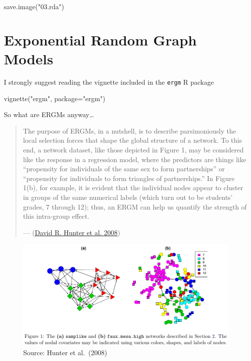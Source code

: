 \documentclass[
]{book}
\newenvironment{Shaded}{\begin{snugshade}}{\end{snugshade}}
\newcommand{\AttributeTok}[1]{\textcolor[rgb]{0.77,0.63,0.00}{#1}}
\newcommand{\FunctionTok}[1]{\textcolor[rgb]{0.00,0.00,0.00}{#1}}
\newcommand{\NormalTok}[1]{#1}
\newcommand{\StringTok}[1]{\textcolor[rgb]{0.31,0.60,0.02}{#1}}
\begin{document}
\begin{Shaded}
\begin{Highlighting}[]
\FunctionTok{save.image}\NormalTok{(}\StringTok{"03.rda"}\NormalTok{)}
\end{Highlighting}
\end{Shaded}

\hypertarget{exponential-random-graph-models}{%
\chapter{Exponential Random Graph Models}\label{exponential-random-graph-models}}

I strongly suggest reading the vignette included in the \texttt{ergm} R package

\begin{Shaded}
\begin{Highlighting}[]
\FunctionTok{vignette}\NormalTok{(}\StringTok{"ergm"}\NormalTok{, }\AttributeTok{package=}\StringTok{"ergm"}\NormalTok{)}
\end{Highlighting}
\end{Shaded}

So what are ERGMs anyway\ldots{}

\begin{quote}
The purpose of ERGMs, in a nutshell, is to describe parsimoniously the local selection forces
that shape the global structure of a network. To this end, a network dataset, like those
depicted in Figure 1, may be considered like the response in a regression model, where the
predictors are things like ``propensity for individuals of the same sex to form partnerships'' or
``propensity for individuals to form triangles of partnerships.'' In Figure 1(b), for example, it
is evident that the individual nodes appear to cluster in groups of the same numerical labels
(which turn out to be students' grades, 7 through 12); thus, an ERGM can help us quantify
the strength of this intra-group effect.

--- (\protect\hyperlink{ref-Hunter2008}{David R. Hunter et al. 2008})
\end{quote}

\begin{figure}
\centering
\includegraphics{hunter2008.png}
\caption{Source: Hunter et al.~(2008)}
\end{figure}
\end{document}
